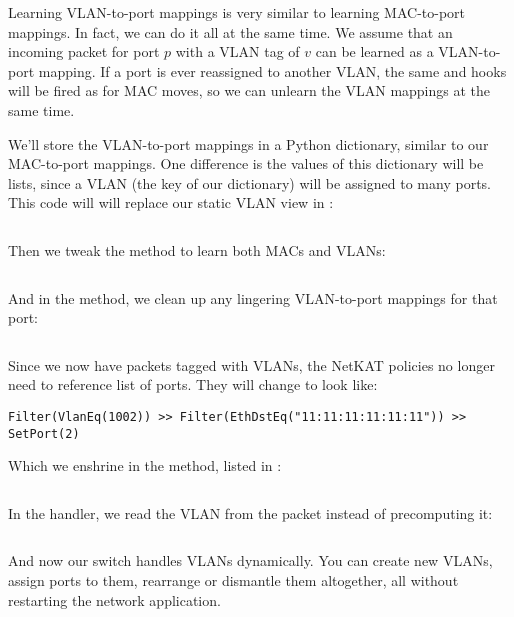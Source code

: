 Learning VLAN-to-port mappings is very similar to learning MAC-to-port mappings.  In fact, 
we can do it all at the
same time.  We assume that an incoming packet for port $p$ with a VLAN tag of $v$ can be learned as a 
VLAN-to-port mapping.  If a port is ever reassigned to another VLAN, the same  and
 hooks will be fired as for MAC moves, so we can unlearn the VLAN mappings at the same
time.  

We'll store the VLAN-to-port mappings in a Python dictionary, similar to our MAC-to-port mappings.  
One difference is the values of this dictionary will be lists, since a VLAN (the key of our dictionary)
will be assigned to many ports.  This code will will replace our static VLAN view in 
:

\inputminted[firstline=65]{python}{code/handling_vlans/network_information_base_dynamic.py}

Then we tweak the  method to learn both MACs and VLANs:

\inputminted[firstline=13,lastline=24]{python}{code/handling_vlans/network_information_base_dynamic.py}

And in the  method, we clean up any lingering VLAN-to-port mappings for that port:

\inputminted[firstline=55,lastline=60]{python}{code/handling_vlans/network_information_base_dynamic.py}

Since we now have packets tagged with VLANs, the NetKAT policies no longer need to reference list of ports.
They will change to look like:

\begin{verbatim}
Filter(VlanEq(1002)) >> Filter(EthDstEq("11:11:11:11:11:11")) >> SetPort(2)
\end{verbatim}

Which we enshrine in the  method, listed in 
:

\inputminted[firstline=23,lastline=29]{python}{code/handling_vlans/vlan2.py}

In the  handler, we read the VLAN from the packet instead of precomputing it:

\inputminted[firstline=49,lastline=54]{python}{code/handling_vlans/vlan2.py}

And now our switch handles VLANs dynamically.  You can create new VLANs, assign ports to them, rearrange or
dismantle them altogether, all without restarting the network application.  


